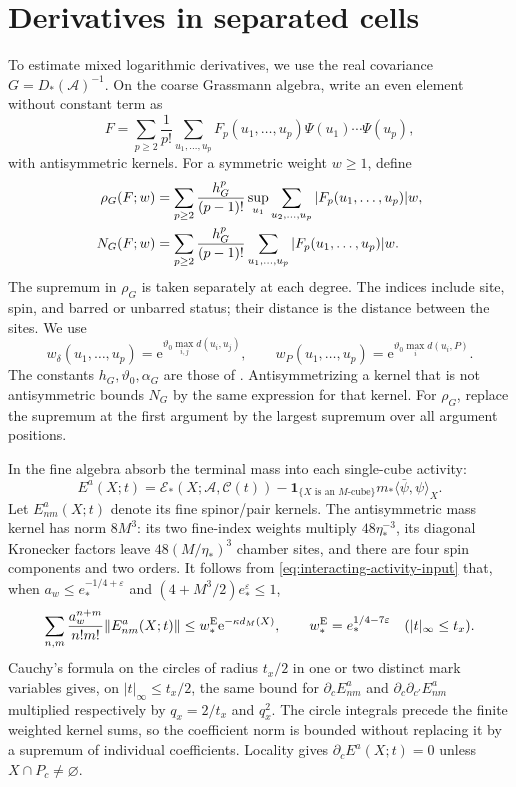 \section{Derivatives in separated cells}
\label{subsec:interacting-separated}

To estimate mixed logarithmic derivatives, we use the
real covariance $G=D_*(\mathscr A)^{-1}$. On the
coarse Grassmann algebra, write an even element
without constant term as
\[
 F=\sum_{p\ge2}\frac1{p!}\sum_{u_1,\ldots,u_p}
 F_p(u_1,\ldots,u_p)\Psi(u_1)\cdots\Psi(u_p),
\]
with antisymmetric kernels.
For a symmetric weight $w\ge1$, define
\begin{align}
 \rho_G(F;w)&=\sum_{p\ge2}\frac{h_G^p}{(p-1)!}
       \sup_{u_1}\sum_{u_2,\ldots,u_p}|F_p(u_1,\ldots,u_p)|w,
                                                     \notag\\
 N_G(F;w)&=\sum_{p\ge2}\frac{h_G^p}{(p-1)!}
       \sum_{u_1,\ldots,u_p}|F_p(u_1,\ldots,u_p)|w .
                                     \label{eq:interacting-tree-norms}
\end{align}
The supremum in $\rho_G$ is taken separately
at each degree. The indices include site, spin,
and barred or unbarred status; their distance
is the distance between the sites. We use
\[
 w_\delta(u_1,\ldots,u_p)=
          \mathrm e^{\vartheta_0\max_{i,j}d(u_i,u_j)},\qquad
 w_P(u_1,\ldots,u_p)=\mathrm e^{\vartheta_0\max_i d(u_i,P)} .
\]
The constants $h_G,\vartheta_0,\alpha_G$ are
those of \cite[(74)]{TerminalPressure}.
Antisymmetrizing a kernel that is not antisymmetric
bounds $N_G$ by the same expression for that
kernel. For $\rho_G$, replace the supremum at
the first argument by the largest supremum
over all argument positions.

In the fine algebra absorb the terminal mass
into each single-cube activity:
\[
 E^a(X;t)=\mathscr E_*(X;\mathscr A,\mathscr C(t))
              -\mathbf1_{\{X\text{ is an }M\text{-cube}\}}
                         m_*\langle\bar\psi,\psi\rangle_X.
\]
Let $E^a_{nm}(X;t)$ denote its fine spinor/pair
kernels. The antisymmetric mass kernel has
norm $8M^3$: its two fine-index weights multiply
$48\eta_*^{-3}$, its diagonal Kronecker factors
leave $48(M/\eta_*)^3$ chamber sites, and there
are four spin components and two orders.
It follows from \eqref{eq:interacting-activity-input}
that, when $a_w\le e_*^{-1/4+\varepsilon}$ and
$(4+M^3/2)e_*^\varepsilon\le1$,
\begin{equation}\label{eq:interacting-absorbed-activity}
 \sum_{n,m}\frac{a_w^{n+m}}{n!m!}\|E^a_{nm}(X;t)\|
          \le w_*^{\rm E}\mathrm e^{-\kappa d_M(X)},\qquad
 w_*^{\rm E}=e_*^{1/4-7\varepsilon}
                                      \quad(|t|_\infty\le t_x).
\end{equation}
Cauchy's formula on the circles of radius $t_x/2$
in one or two distinct mark variables gives,
on $|t|_\infty\le t_x/2$, the same bound
for $\partial_cE^a_{nm}$ and
$\partial_c\partial_{c'}E^a_{nm}$ multiplied
respectively by $q_x=2/t_x$ and $q_x^2$.
The circle integrals precede the finite weighted
kernel sums, so the coefficient norm is bounded
without replacing it by a supremum of individual
coefficients. Locality gives
$\partial_cE^a(X;t)=0$ unless $X\cap P_c\ne\varnothing$.

